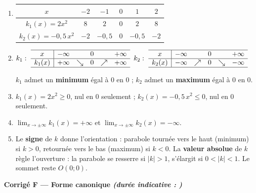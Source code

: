 \documentclass[11pt,a4paper]{article}
\newcommand{\partie}[2]{%
  \vspace{6pt}
  \noindent\colorbox{blue!12}{\parbox{\dimexpr\linewidth-2\fboxsep}{%
    \bfseries\color{blue!50!black} #1 \hfill \normalfont\small\itshape (durée indicative : #2)}}%
  \vspace{4pt}}
\begin{document}
\begin{enumerate}[leftmargin=1.4em,itemsep=3pt]
  \item
  \begin{center}
  \begin{tabular}{|c|c|c|c|c|c|}
  \hline
  $x$ & $-2$ & $-1$ & $0$ & $1$ & $2$\\ \hline
  $k_1(x)=2x^2$ & $8$ & $2$ & $0$ & $2$ & $8$\\ \hline
  $k_2(x)=-0{,}5\,x^2$ & $-2$ & $-0{,}5$ & $0$ & $-0{,}5$ & $-2$\\ \hline
  \end{tabular}
  \end{center}

  \item
  \begin{center}
  $k_1:\ \begin{array}{c|ccccc}
  \hline
  x & -\infty & & 0 & & +\infty\\ \hline
  k_1(x) & +\infty & \searrow & 0 & \nearrow & +\infty\\ \hline
  \end{array}$
  \hspace{1.2cm}
  $k_2:\ \begin{array}{c|ccccc}
  \hline
  x & -\infty & & 0 & & +\infty\\ \hline
  k_2(x) & -\infty & \nearrow & 0 & \searrow & -\infty\\ \hline
  \end{array}$
  \end{center}
  $k_1$ admet un \textbf{minimum} égal à $0$ en $0$ ; $k_2$ admet un \textbf{maximum} égal à $0$ en $0$.

  \item $k_1(x)=2x^2\geq 0$, nul en $0$ seulement ; $k_2(x)=-0{,}5\,x^2\leq 0$, nul en $0$ seulement.

  \item $\displaystyle\lim_{x\to\pm\infty}k_1(x)=+\infty$ et $\displaystyle\lim_{x\to\pm\infty}k_2(x)=-\infty$.

  \item Le \textbf{signe} de $k$ donne l'orientation : parabole tournée vers le haut (minimum) si $k>0$,
  retournée vers le bas (maximum) si $k<0$. La \textbf{valeur absolue} de $k$ règle l'ouverture :
  la parabole se resserre si $|k|>1$, s'élargit si $0<|k|<1$. Le sommet reste $O(0;0)$.
\end{enumerate}

\partie{Corrigé F — Forme canonique}{}
\end{document}
